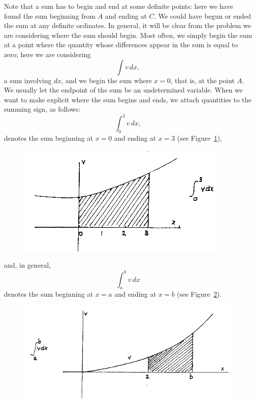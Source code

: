 \documentclass[twoside,openright]{article}
\begin{document}
Note that a sum has to begin and end at some definite points: here we
have found the sum beginning from $A$ and ending at $C$.  We could
have begun or ended the sum at any definite ordinates.  In general, it
will be clear from the problem we are considering where the sum should
begin. Most often, we simply begin the sum at a point where the
quantity whose differences appear in the sum is equal to zero; here we
are considering
$$\int\! v\,dx,$$
a sum involving $dx$, and we begin the sum where $x=0$, that is, at
the point $A$.  We usually let the endpoint of the sum be an
undetermined variable.  When we want to make explicit where the sum
begins and ends, we attach quantities to the summing sign, as follows:
$$\int^3_0\!v\,dx,$$
denotes the sum beginning at $x=0$ and ending at $x=3$ (see Figure~\ref{sum03}),
\begin{figure}[htp]
\begin{center}
\includegraphics[width=\textwidth]{fig/Figure36B}
\caption{}
\label{sum03}
\vspace{-10pt}
\end{center}
\end{figure} 
and, in general,
$$\int^b_a\!v\,dx$$
denotes the sum beginning at $x=a$ and ending at $x=b$ (see Figure~\ref{sumab}).
\begin{figure}[htp]
\begin{center}
\includegraphics[width=\textwidth]{fig/Figure36C}
\caption{}
\label{sumab}
\vspace{-10pt}
\end{center}
\end{figure} 
\end{document}

